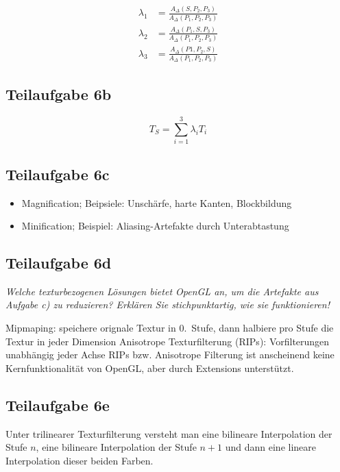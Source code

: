 \documentclass[a4paper]{scrartcl}
\begin{document}
\begin{align}
    \lambda_1 &= \frac{A_\Delta(S, P_2, P_3)}{A_\Delta(P_1, P_2, P_3)}\\
    \lambda_2 &= \frac{A_\Delta(P_1, S, P_3)}{A_\Delta(P_1, P_2, P_3)}\\
    \lambda_3 &= \frac{A_\Delta(P1, P_2, S)}{A_\Delta(P_1, P_2, P_3)}
\end{align}


\subsection*{Teilaufgabe 6b}
\[T_S = \sum_{i=1}^3 \lambda_i T_i\]

\subsection*{Teilaufgabe 6c}
\begin{itemize}
    \item Magnification; Beipsiele: Unschärfe, harte Kanten, Blockbildung
    \item Minification; Beispiel: Aliasing-Artefakte durch Unterabtastung
\end{itemize}

\subsection*{Teilaufgabe 6d}
\textit{Welche texturbezogenen Lösungen bietet OpenGL an, um die Artefakte aus
Aufgabe c) zu reduzieren? Erklären Sie stichpunktartig, wie sie funktionieren!}

Mipmaping: speichere orignale Textur in 0.~Stufe, dann halbiere pro Stufe die
Textur in jeder Dimension Anisotrope Texturfilterung (RIPs): Vorfilterungen
unabhängig jeder Achse RIPs bzw. Anisotrope Filterung ist anscheinend keine
Kernfunktionalität von OpenGL, aber durch Extensions unterstützt.

\subsection*{Teilaufgabe 6e}
Unter trilinearer Texturfilterung versteht man eine bilineare Interpolation
der Stufe $n$, eine bilineare Interpolation der Stufe $n+1$ und dann eine
lineare Interpolation dieser beiden Farben.
\end{document}
